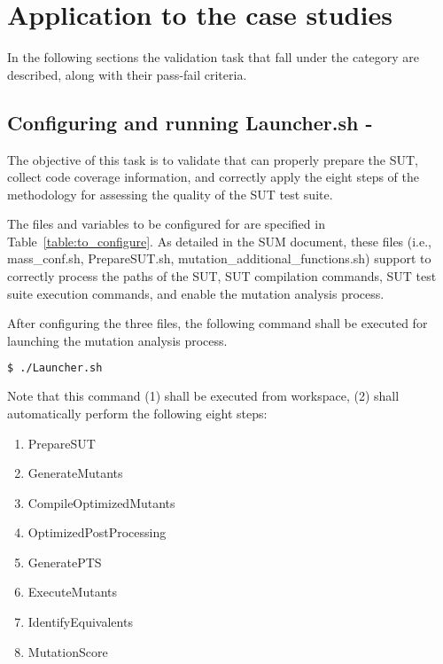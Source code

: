 \section{Application to the case studies}
\label{sec:case_studies}

In the following sections the validation task that fall under the  category are described, along with their pass-fail criteria.


\subsection{Configuring \MASS and running Launcher.sh - \MASS}
\label{sec:configuring:mass}

The objective of this task is to validate that \MASS can properly prepare the SUT, collect code coverage information, and correctly apply the eight steps of the methodology for assessing the quality of the SUT test suite.



The files and variables to be configured for \MASS are specified in Table~\ref{table:to_configure}. As detailed in the SUM document, these files (i.e., mass\_conf.sh, PrepareSUT.sh, mutation\_additional\_functions.sh) support \MASS to correctly process the paths of the SUT, SUT compilation commands, SUT test suite execution commands, and enable the mutation analysis process.

After configuring the three files, the following command shall be executed for launching the mutation analysis process. 

\begin{lstlisting}[language=bash]
  $ ./Launcher.sh
\end{lstlisting}

Note that this command (1) shall be executed from \MASS workspace, (2) shall automatically perform the following eight steps:

\begin{enumerate}
  \item PrepareSUT
  \item GenerateMutants
  \item CompileOptimizedMutants
  \item OptimizedPostProcessing
  \item GeneratePTS
  \item ExecuteMutants
  \item IdentifyEquivalents
  \item MutationScore
\end{enumerate}


